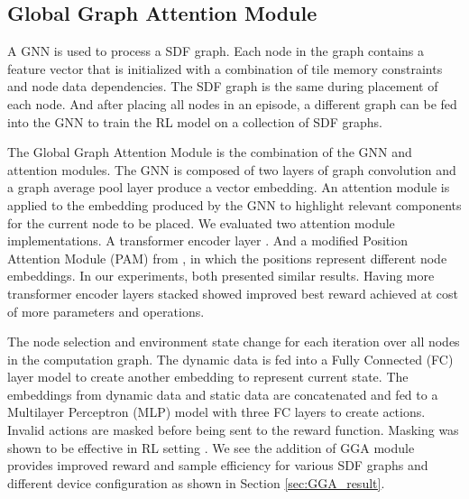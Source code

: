 \subsection{Global Graph Attention Module}

A GNN is used to process a SDF graph. 
Each node in the graph contains a feature vector that is initialized with a combination of tile memory constraints and node data dependencies. 
The SDF graph is the same during placement of each node. 
And after placing all nodes in an episode, a different graph can be fed into the GNN to train the RL model on a collection of SDF graphs. 

The Global Graph Attention Module is the combination of the GNN and attention modules.
The GNN is composed of two layers of graph convolution \cite{wu2019simplifying} and a graph average pool layer produce a vector embedding.
An attention module is applied to the embedding produced by the GNN to highlight relevant components for the current node to be placed. 
We evaluated two attention module implementations. A transformer encoder layer \cite{vaswani2017attention}. 
And a modified Position Attention Module (PAM) from \cite{fu2019dual}, in which the positions represent different node embeddings.
In our experiments, both presented similar results. Having more transformer encoder layers stacked showed improved best reward achieved at cost of more parameters and operations.

The node selection and environment state change for each iteration over all nodes in the computation graph. 
The dynamic data is fed into a Fully Connected (FC) layer model to create another embedding to represent current state. 
The embeddings from dynamic data and static data are concatenated and fed to a Multilayer Perceptron (MLP) model with three FC layers to create actions. 
Invalid actions are masked before being sent to the reward function. 
Masking was shown to be effective in RL setting \cite{Shengyi_mask}.
We see the addition of GGA module provides improved reward and sample efficiency for various SDF graphs and different device configuration as shown in Section \ref{sec:GGA_result}.


